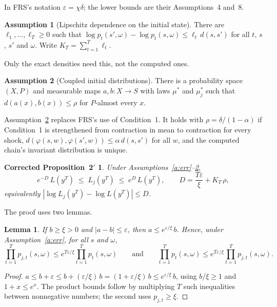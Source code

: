 \documentclass[11pt]{article}
\newtheorem{lemma}[theorem]{Lemma}
\newtheorem*{newpropii}{Corrected Proposition~2$'$}
\theoremstyle{definition}
\newtheorem{assumption}{Assumption}
\theoremstyle{remark}
\begin{document}
\noindent In FRS's notation $\varepsilon = \chi\delta$; the lower bounds are their Assumptions~4
and~8.

\begin{assumption}[Lipschitz dependence on the initial state]\label{a:lip}
There are $\ell_1, \ldots, \ell_T \ge 0$ such that
$\log p_t(s',\omega) - \log p_t(s,\omega) \le \ell_t\, d(s,s')$ for all $t$, $s$, $s'$ and
$\omega$. Write $K_T = \sum_{t=1}^T \ell_t$.
\end{assumption}

\noindent Only the exact densities need this, not the computed ones.

\begin{assumption}[Coupled initial distributions]\label{a:coup}
There is a probability space $(X, P)$ and measurable maps $a, b: X \to S$ with laws $\mu^*$ and
$\mu_j^*$ such that $d(a(x), b(x)) \le \rho$ for $P$-almost every $x$.
\end{assumption}

\noindent Assumption~\ref{a:coup} replaces FRS's use of Condition~1. It holds with
$\rho = \delta/(1-\alpha)$ if Condition~1 is strengthened from contraction in mean to contraction
for every shock, $d(\varphi(s,w), \varphi(s',w)) \le \alpha\,d(s,s')$ for all $w$, and the
computed chain's invariant distribution is unique.

\begin{newpropii}
Under Assumptions~\ref{a:err}--\ref{a:coup},
\[
  e^{-D}\,L(y^T) \;\le\; L_j(y^T) \;\le\; e^{D}\,L(y^T),
  \qquad D = \frac{T\varepsilon}{\xi} + K_T\,\rho ,
\]
equivalently $|\log L_j(y^T) - \log L(y^T)| \le D$.
\end{newpropii}

The proof uses two lemmas.

\begin{lemma}\label{lem:factor}
If $b \ge \xi > 0$ and $|a - b| \le \varepsilon$, then $a \le e^{\varepsilon/\xi}\,b$. Hence,
under Assumption~\ref{a:err}, for all $s$ and $\omega$,
\[
  \prod_{t=1}^T p_{j,t}(s,\omega) \le e^{T\varepsilon/\xi}\prod_{t=1}^T p_t(s,\omega)
  \qquad\text{and}\qquad
  \prod_{t=1}^T p_t(s,\omega) \le e^{T\varepsilon/\xi}\prod_{t=1}^T p_{j,t}(s,\omega).
\]
\end{lemma}

\begin{proof}
$a \le b + \varepsilon \le b + (\varepsilon/\xi)\,b = (1 + \varepsilon/\xi)\,b \le
e^{\varepsilon/\xi}\,b$, using $b/\xi \ge 1$ and $1 + x \le e^x$. The product bounds follow by
multiplying $T$ such inequalities between nonnegative numbers; the second uses $p_{j,t} \ge \xi$.
\end{proof}
\end{document}

